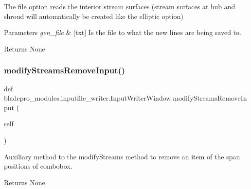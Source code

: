 The file option reads the interior stream surfaces (stream surfaces at hub and shroud will automatically be created like the elliptic option)


\begin{DoxyParams}{Parameters}
{\em gen\+\_\+file} & \mbox{[}txt\mbox{]} Is the file to what the new lines are being saved to. \\
\hline
\end{DoxyParams}
\begin{DoxyReturn}{Returns}
None 
\end{DoxyReturn}
\hypertarget{a00073_ade4195a752861e46586e7b163136620f}{}\label{a00073_ade4195a752861e46586e7b163136620f} 
\subsubsection{\texorpdfstring{modify\+Streams\+Remove\+Input()}{modifyStreamsRemoveInput()}}
{\footnotesize\ttfamily def bladepro\+\_\+modules.\+inputfile\+\_\+writer.\+Input\+Writer\+Window.\+modify\+Streams\+Remove\+Input (\begin{DoxyParamCaption}\item[{}]{self }\end{DoxyParamCaption})}



Auxiliary method to the modify\+Streams method to remove an item of the span positions of combobox. 

\begin{DoxyReturn}{Returns}
None 
\end{DoxyReturn}
\hypertarget{a00073_af60dda179dc289691a59b52cb8ed3e70}{}\label{a00073_af60dda179dc289691a59b52cb8ed3e70} 
